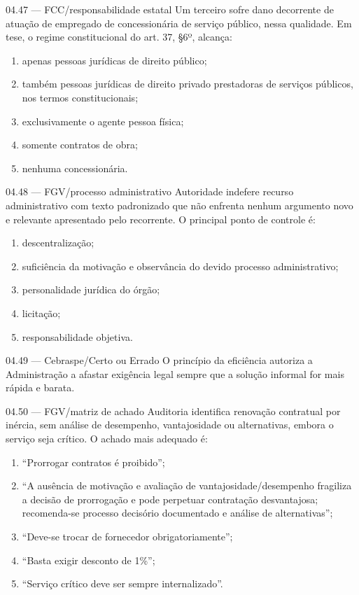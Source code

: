 \begin{questao}{ 04.47 — FCC/responsabilidade estatal}
Um terceiro sofre dano decorrente de atuação de empregado de concessionária de serviço público, nessa qualidade. Em tese, o regime constitucional do art. 37, §6º, alcança:
\begin{enumerate}[label=\Alph*)]
\item apenas pessoas jurídicas de direito público;
\item também pessoas jurídicas de direito privado prestadoras de serviços públicos, nos termos constitucionais;
\item exclusivamente o agente pessoa física;
\item somente contratos de obra;
\item nenhuma concessionária.
\end{enumerate}
\end{questao}

\begin{questao}{ 04.48 — FGV/processo administrativo}
Autoridade indefere recurso administrativo com texto padronizado que não enfrenta nenhum argumento novo e relevante apresentado pelo recorrente. O principal ponto de controle é:
\begin{enumerate}[label=\Alph*)]
\item descentralização;
\item suficiência da motivação e observância do devido processo administrativo;
\item personalidade jurídica do órgão;
\item licitação;
\item responsabilidade objetiva.
\end{enumerate}
\end{questao}

\begin{questao}{ 04.49 — Cebraspe/Certo ou Errado}
O princípio da eficiência autoriza a Administração a afastar exigência legal sempre que a solução informal for mais rápida e barata.
\end{questao}

\begin{questao}{ 04.50 — FGV/matriz de achado}
Auditoria identifica renovação contratual por inércia, sem análise de desempenho, vantajosidade ou alternativas, embora o serviço seja crítico. O achado mais adequado é:
\begin{enumerate}[label=\Alph*)]
\item ``Prorrogar contratos é proibido'';
\item ``A ausência de motivação e avaliação de vantajosidade/desempenho fragiliza a decisão de prorrogação e pode perpetuar contratação desvantajosa; recomenda-se processo decisório documentado e análise de alternativas'';
\item ``Deve-se trocar de fornecedor obrigatoriamente'';
\item ``Basta exigir desconto de 1\%'';
\item ``Serviço crítico deve ser sempre internalizado''.
\end{enumerate}
\end{questao}